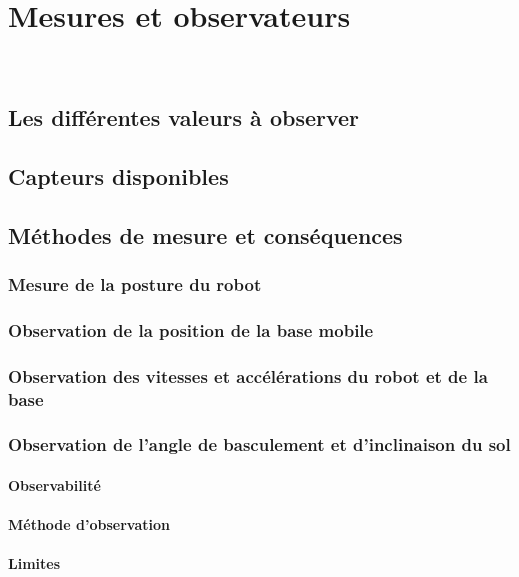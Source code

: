 \chapter{Mesures et observateurs}

	~

	\section{Les différentes valeurs à observer}
	\section{Capteurs disponibles}
	\section{Méthodes de mesure et conséquences}
		\subsection{Mesure de la posture du robot}
		\subsection{Observation de la position de la base mobile}
		\subsection{Observation des vitesses et accélérations du robot et de la base}
		\subsection{Observation de l'angle de basculement et d'inclinaison du sol}
			\subsubsection{Observabilité}
			\subsubsection{Méthode d'observation}
			\subsubsection{Limites}